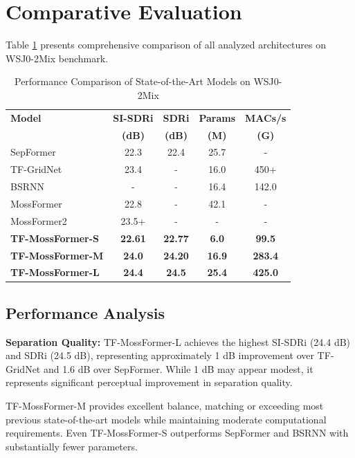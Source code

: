 \documentclass[conference]{IEEEtran}
\begin{document}
\section{Comparative Evaluation}

Table \ref{tab:comparison} presents comprehensive comparison of all analyzed architectures on WSJ0-2Mix benchmark.

\begin{table}[h]
\centering
\caption{Performance Comparison of State-of-the-Art Models on WSJ0-2Mix}
\label{tab:comparison}
\begin{tabular}{|l|c|c|c|c|}
\hline
\textbf{Model} & \textbf{SI-SDRi} & \textbf{SDRi} & \textbf{Params} & \textbf{MACs/s} \\
& \textbf{(dB)} & \textbf{(dB)} & \textbf{(M)} & \textbf{(G)} \\
\hline
SepFormer & 22.3 & 22.4 & 25.7 & - \\
\hline
TF-GridNet & 23.4 & - & 16.0 & 450+ \\
\hline
BSRNN & - & - & 16.4 & 142.0 \\
\hline
MossFormer & 22.8 & - & 42.1 & - \\
\hline
MossFormer2 & 23.5+ & - & - & - \\
\hline
\textbf{TF-MossFormer-S} & \textbf{22.61} & \textbf{22.77} & \textbf{6.0} & \textbf{99.5} \\
\hline
\textbf{TF-MossFormer-M} & \textbf{24.0} & \textbf{24.20} & \textbf{16.9} & \textbf{283.4} \\
\hline
\textbf{TF-MossFormer-L} & \textbf{24.4} & \textbf{24.5} & \textbf{25.4} & \textbf{425.0} \\
\hline
\end{tabular}
\end{table}

\subsection{Performance Analysis}

\textbf{Separation Quality:} TF-MossFormer-L achieves the highest SI-SDRi (24.4 dB) and SDRi (24.5 dB), representing approximately 1 dB improvement over TF-GridNet and 1.6 dB over SepFormer. While 1 dB may appear modest, it represents significant perceptual improvement in separation quality.

TF-MossFormer-M provides excellent balance, matching or exceeding most previous state-of-the-art models while maintaining moderate computational requirements. Even TF-MossFormer-S outperforms SepFormer and BSRNN with substantially fewer parameters.
\end{document}
